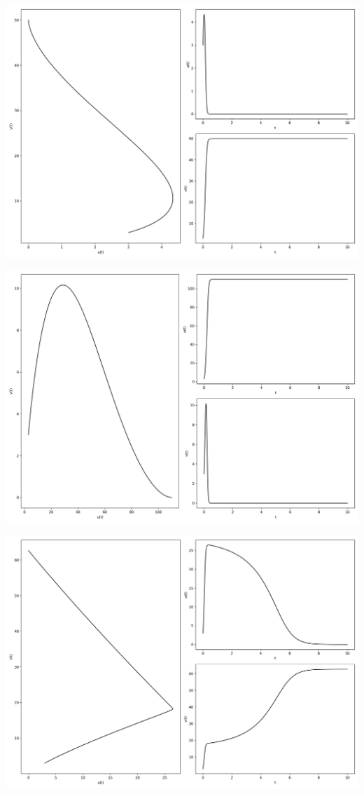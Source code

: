 \documentclass[12pt,a4paper]{jsarticle}
\makeatletter
\def\figcaption{\def\@captype{figure}\caption}
\makeatother
\begin{document}
\figcaption{$u_0=3.00, v_0=3.00, a_1=1.90, b_1=0.00, c_1=-1.90, a_2=1.90, b_2=0.00, c_2=1.90, T = 10, N = 2000$}
\includegraphics[scale=0.33]{u3,0v3,0a114,0b1-1,1c1-0,9a220,0b2-0,5c2-0,4t1,00e+01n2,00e+03.png}
\figcaption{$u_0=3.00, v_0=3.00, a_1=14.00, b_1=-1.10, c_1=-0.90, a_2=20.00, b_2=-0.50, c_2-=0.40, T = 10, N = 2000$}
\includegraphics[scale=0.33]{u3,0v3,0a122,0b1-0,2c1-0,4a217,0b2-0,5c2-0,3t1,00e+01n2,00e+03.png}
\figcaption{$u_0=3.00, v_0=3.00, a_1=22.00, b_1=-0.20, c_1=-0.40, a_2=17.00, b_2=-0.50, c_2=-0.30, T = 10, N = 2000$}
\includegraphics[scale=0.33]{u3,0v3,0a123,2b1-0,6c1-0,4a218,8b2-0,5c2-0,3t1,00e+01n2,00e+03.png}
\end{document}
